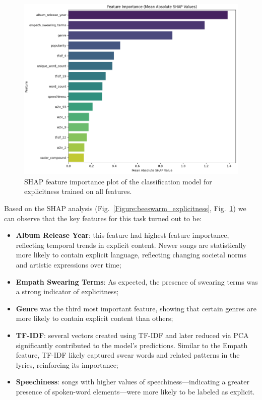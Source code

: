 \begin{center}
\begin{figure}[H]
  \centering
  \includegraphics[width=6in]{img/feature_importance_explicitness.png}
  \caption{SHAP feature importance plot of the classification model for
  explicitness  trained on all features.}
  \label{Figure:feature_importance_explicitness}
\end{figure}
\end{center}


Based on the SHAP analysis (Fig.~\ref{Figure:beeswarm_explicitness},
Fig.~\ref{Figure:feature_importance_explicitness}) we can observe that the key
features for this task turned out to be:
\begin{itemize}
  \item \textbf{Album Release Year}: this feature had  highest feature
    importance, reflecting temporal trends in explicit content. Newer songs are
    statistically more likely to contain explicit language, reflecting changing
    societal norms and artistic expressions over time;
  \item \textbf{Empath Swearing Terms}: As expected, the presence of swearing
    terms was a strong indicator of explicitness;
  \item \textbf{Genre} was the third most important feature, showing that
    certain genres  are more likely to contain explicit content than others;
  \item \textbf{TF-IDF}: several vectors created using TF-IDF and later reduced
    via PCA significantly contributed to the model's predictions. Similar to
    the Empath feature, TF-IDF likely captured swear words and related patterns
    in the lyrics, reinforcing its importance;
  \item \textbf{Speechiness}: songs with higher values of
    speechiness—indicating a greater presence of spoken-word elements—were more
    likely to be labeled as explicit.
\end{itemize}




